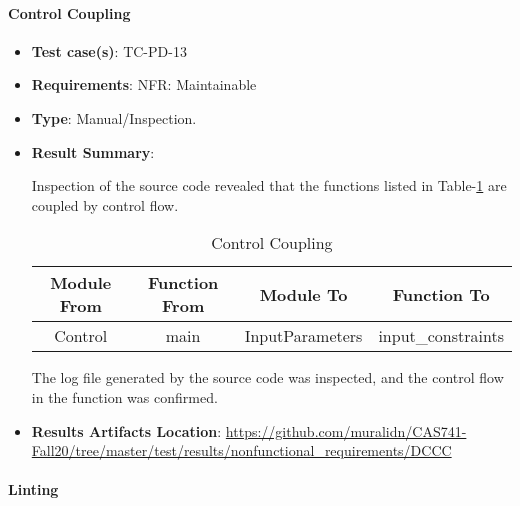 \documentclass[12pt, titlepage]{article}
\begin{document}
\paragraph{Control Coupling} 

\begin{itemize}

\item \textbf{Test case(s)}: TC-PD-13

\item \textbf{Requirements}: NFR: Maintainable

\item \textbf{Type}: Manual/Inspection.

\item \textbf{Result Summary}: 

Inspection of the source code revealed that the functions listed in Table-\ref{tab:ctrlCoupling}  
are coupled by control flow.

\begin{table}[]
\caption{Control Coupling}
\label{tab:ctrlCoupling}
\begin{tabular}{c|c|c|c}
\multicolumn{1}{c|}{Module From} & \multicolumn{1}{c|}{Function From} & Module To         & Function To     \\ \hline
Control                      & main                           & InputParameters & input\_constraints    \\
\end{tabular}
\end{table}

The log file generated by the source code was inspected, and the control flow in the 
function was confirmed.

\item \textbf{Results Artifacts Location}:  \url{https://github.com/muralidn/CAS741-Fall20/tree/master/test/results/nonfunctional_requirements/DCCC}

\end{itemize}

\paragraph{Linting}
\end{document}
